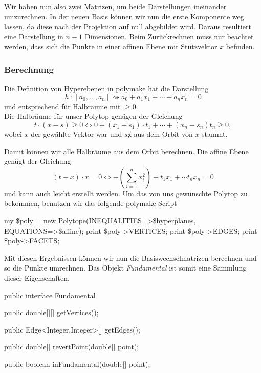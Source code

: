          Wir haben nun also zwei Matrizen, um beide Darstellungen ineinander umzurechnen. In der neuen Basis können wir nun die erste Komponente weg lassen, da diese nach der Projektion auf null abgebildet wird. Daraus resultiert eine Darstellung in $n-1$ Dimensionen.
         Beim Zurückrechnen muss nur beachtet werden, dass sich die Punkte in einer affinen Ebene mit Stützvektor $x$ befinden.

        \subsubsection*{Berechnung}

         Die Definition von Hyperebenen in polymake hat die Darstellung
         $$
            h \, : \, [a_0, ..., a_n] \rightsquigarrow a_0 + a_1 x_1 + \cdots + a_n x_n = 0
         $$
         und entsprechend für Halbräume mit $\geq 0$.\\

         Die Halbräume für unser Polytop genügen der Gleichung
         $$
            t \cdot (x - s) \geq 0 \Leftrightarrow 0 + (x_1-s_1)\cdot t_1 + \cdots + (x_n -s_n)t_n \geq 0,
         $$
         wobei $x$ der gewählte Vektor war und $s \not x$ aus dem Orbit von $x$ stammt.

         Damit können wir alle Halbräume aus dem Orbit berechnen. Die affine Ebene genügt der Gleichung
         $$
            (t - x) \cdot x = 0 \Leftrightarrow - \left( \sum_{i=1}^n x_i^2 \right) + t_1 x_1 + \cdots t_n x_n = 0
         $$
         und kann auch leicht erstellt werden. Um das von uns gewünschte Polytop zu bekommen, benutzen wir das folgende polymake-Script

         \begin{code}
            my \$poly = new Polytope(INEQUALITIES=>\$hyperplanes, EQUATIONS=>\$affine);
            print \$poly->VERTICES;
            print \$poly->EDGES;
            print \$poly->FACETS;
         \end{code}

         Mit diesen Ergebnissen können wir nun die Basiswechselmatrizen berechnen und so die Punkte umrechnen. Das Objekt \emph{Fundamental} ist somit
         eine Sammlung dieser Eigenschaften.

         \begin{code}
            public interface Fundamental {
               public double[][] getVertices();
               
               public Edge<Integer,Integer>[] getEdges();

               public double[] revertPoint(double[] point);

               public boolean inFundamental(double[] point);
            }
         \end{code}
         

